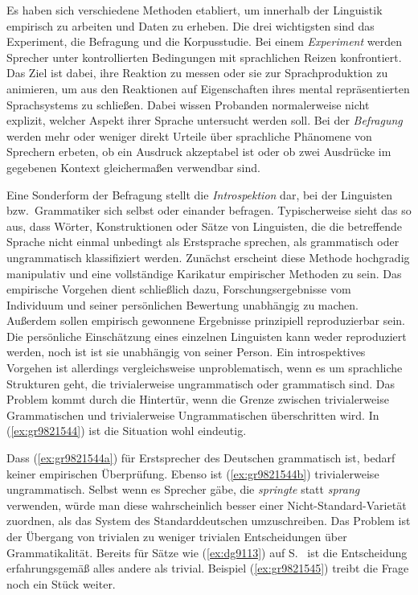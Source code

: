 Es haben sich verschiedene Methoden etabliert, um innerhalb der Linguistik empirisch zu arbeiten und Daten zu erheben.
Die drei wichtigsten sind das Experiment, die Befragung und die Korpusstudie.
Bei einem \textit{Experiment} werden Sprecher unter kontrollierten Bedingungen mit sprachlichen Reizen konfrontiert.
Das Ziel ist dabei, ihre Reaktion zu messen oder sie zur Sprachproduktion zu animieren, um aus den Reaktionen auf Eigenschaften ihres mental repräsentierten Sprachsystems zu schließen.
Dabei wissen Probanden normalerweise nicht explizit, welcher Aspekt ihrer Sprache untersucht werden soll.
Bei der \textit{Befragung} werden mehr oder weniger direkt Urteile über sprachliche Phänomene von Sprechern erbeten, \zB ob ein Ausdruck akzeptabel ist oder ob zwei Ausdrücke im gegebenen Kontext gleichermaßen verwendbar sind.

Eine Sonderform der Befragung stellt die \textit{Introspektion} dar, bei der Linguisten bzw.\ Grammatiker sich selbst oder einander befragen.
Typischerweise sieht das so aus, dass Wörter, Konstruktionen oder Sätze von Linguisten, die die betreffende Sprache nicht einmal unbedingt als Erstsprache sprechen, als grammatisch oder ungrammatisch klassifiziert werden.
Zunächst erscheint diese Methode hochgradig manipulativ und eine vollständige Karikatur empirischer Methoden zu sein.
Das empirische Vorgehen dient schließlich dazu, Forschungsergebnisse vom Individuum und seiner persönlichen Bewertung unabhängig zu machen.
Außerdem sollen empirisch gewonnene Ergebnisse prinzipiell reproduzierbar sein.
Die persönliche Einschätzung eines einzelnen Linguisten kann weder reproduziert werden, noch ist ist sie unabhängig von seiner Person.
Ein introspektives Vorgehen ist allerdings vergleichsweise unproblematisch, wenn es um sprachliche Strukturen geht, die trivialerweise ungrammatisch oder grammatisch sind.
Das Problem kommt durch die Hintertür, wenn die Grenze zwischen trivialerweise Grammatischen und trivialerweise Ungrammatischen überschritten wird.
In (\ref{ex:gr9821544}) ist die Situation wohl eindeutig.

\begin{exe}
	\ex\label{ex:gr9821544}
	\begin{xlist}
	\end{xlist}
\end{exe}

Dass (\ref{ex:gr9821544a}) für Erstsprecher des Deutschen grammatisch ist, bedarf keiner empirischen Überprüfung.
Ebenso ist (\ref{ex:gr9821544b}) trivialerweise ungrammatisch.
Selbst wenn es Sprecher gäbe, die \textit{springte} statt \textit{sprang} verwenden, würde man diese wahrscheinlich besser einer Nicht-Standard-Varietät zuordnen, als das System des Standarddeutschen umzuschreiben.
Das Problem ist der Übergang von trivialen zu weniger trivialen Entscheidungen über Grammatikalität.
Bereits für Sätze wie (\ref{ex:dg9113}) auf S.\ \pageref{ex:dg9113} ist die Entscheidung erfahrungsgemäß alles andere als trivial.
Beispiel (\ref{ex:gr9821545}) treibt die Frage noch ein Stück weiter.


